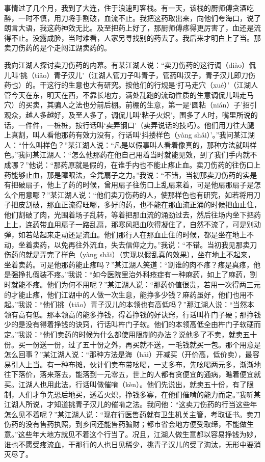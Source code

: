 \documentclass[12pt,UTF8]{ctexbook}
\begin{document}
事情过了几个月，我到了大连，住于浪速町客栈。有一天，该栈的厨师傅贪酒吃醉，一时不慎，用刀将手割破，血流不止。我把这药取出来，向他们夸海口，说了朗言大语，我这药神效无比。及至把药上好了，那厨师傅疼得更厉害了，血还是流得不止。没露成脸，当时难看，人家另寻找别的药去了。我后来才明白上了当。那卖刀伤药的是个走闯江湖卖药的。

我向江湖人探讨卖刀伤药的内幕。有某江湖人说：“卖刀伤药的这行调（diào）侃儿叫‘挑（tiǎo）青子汉儿’（江湖人管刀子叫青子，管药叫汉子，青子汉儿即刀伤药也）的。干这行的生意也大有研究。按他们的行规是‘打马走穴（xué）’（江湖人管今天在东，明天在西，不靠长地方，满处乱跑的流动性质的生意调侃儿叫走马穴）的买卖，其骗人之法也分前后棚。前棚的生意，第一是‘圆粘（nián）子’招引观众，越人多越好，及至人多了，调侃儿叫‘粘子火炽’，围多了人时，嘴里所说的话，一件件，一桩桩，按行话叫‘卖弄钢口’（卖弄说话的技巧）。他们用刀往大腿上真割，叫人看他那药有效力没有，行话叫‘抖搂样色（yàng shǎi）’。”我问某江湖人：“什么叫样色？”某江湖人说：“凡是以假事叫人看着像真的，那种方法就叫样色。”我问某江湖人：“怎么他那药在他自己用着当时就能见效，到了我们手内就不成哪？”他说：“那药原就是假的，在谁手内也不能止疼止血。卖刀伤药的往伤口上药能够止血，那是障眼法，全凭扇子之力。”我说：“不错，当初那卖刀伤药的实是有把破扇子，他上了药的时候，曾用扇子往伤口上乱扇来着，可是他扇那扇子是怎么个用意哪？”某江湖人说：“他们卖刀伤药的人，使那样色也有研究，如若将用刀子把皮割破，那血正流得旺哪，多好的药，也不能在那血流正涌的时候把血止住，他们割破了肉，光围着场子乱转，等着把那血流的涌劲过去，然后往场内坐下把药上上，连药带血用扇子一路乱扇，那寒风把血吹得凝住了，自然不流了，可是别动弹，如若站起来走动还是流血。他们那行人在那血止住的时候，都是坐在地上不动，坐着卖药，以免再往外流血，失去信仰之力。”我说：“不错。当初我见那卖刀伤药的就是弄完了样色（yàng shǎi）（实现以假乱真的效果），坐在地上不起来，坐着卖药。可是他那药能止疼吗？”某江湖人笑道：“割谁的肉不疼？疼是真疼，他是强挣扎假装不疼。”我说：“如今医院里治外科疮症有一种麻药，如上了麻药，割时就能不疼。他们为何不用呢？”某江湖人说：“那药价值很贵，若用一次得两三元的才能止疼，他们江湖中的人做一次生意，能挣多少钱？麻药虽好，他们也用不起。”我说：“他们挑（tiǎo）青子汉儿的本领也有高低吗？”那江湖人说：“当然本领有高有低。那本领高的能多挣钱，得着挣钱的好诀窍，行话叫杵门子硬；那挣钱少的是没有得着挣钱的诀窍，行话叫杵门子软。他们的本领高低全由杵门子软硬而定。”我说：“他们卖药的时候为什么都使用限制的办法？说他多了不卖，就卖五十份。买一份送一份，过了五十份之外，再买就不送，一毛钱就买一包。那个用意是怎么回事？”某江湖人说：“那种方法是海（hāi）开减买（开价高，低价卖），最容易引人上当。有一种布摊，伙计们卖布带吆喝，一丈多布，先吆喝两元多，渐渐地往下落价，落来落去，能落到一元零五，世上的人都有贪便宜的通病，瞧着便宜就买。江湖人也用此法，行话叫做催啃（kèn）。他们先说出，就卖五十份，有了限制，人们才争先恐后地买，透着火炽，挣钱多寡，在他们催啃的能力而定。”我听某江湖人所说，才知道挑青子汉儿的催啃之法。我问他：“这卖刀伤药的行当这些年怎么见不着呢？”某江湖人说：“现在行医售药就有卫生机关主管，考取证书。卖刀伤药的没有售药执照，到乡间还能售药骗财；都市省会地方便受取缔，不能做生意。”这些年大地方就见不着这个行当了。况且，江湖人做生意都以容易挣钱为妙，谁也不愿受疼流血，干那行的人也日见稀少，挑青子汉儿的受了淘汰，无形中要消灭尽了。
\end{document}
